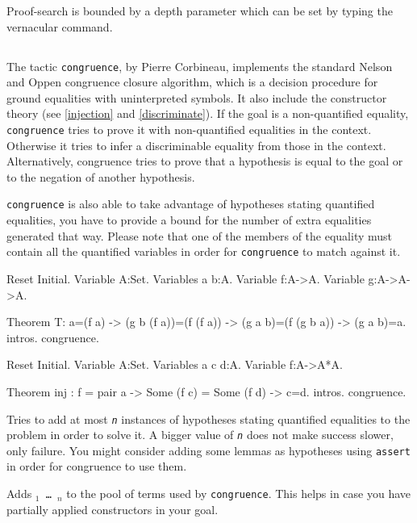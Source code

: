 Proof-search is bounded by a depth parameter which can be set by typing the
{} 
vernacular command.


\subsection{}
\label{congruence}

The tactic {\tt congruence}, by Pierre Corbineau, implements the standard Nelson and Oppen
congruence closure algorithm, which is a decision procedure for ground
equalities with uninterpreted symbols. It also include the constructor theory
(see \ref{injection} and \ref{discriminate}).
If the goal is a non-quantified equality, {\tt congruence} tries to
prove it with non-quantified equalities in the context. Otherwise it
tries to infer a discriminable equality from those in the context. Alternatively, congruence tries to prove that a hypothesis is equal to the goal or to the negation of another hypothesis.

{\tt congruence} is also able to take advantage of hypotheses stating quantified equalities, you have to provide a bound for the number of extra equalities generated that way. Please note that one of the members of the equality must contain all the quantified variables in order for {\tt congruence} to match against it.

\begin{coq_eval}
Reset Initial.
Variable A:Set.
Variables a b:A.
Variable f:A->A.
Variable g:A->A->A.
\end{coq_eval}

\begin{coq_example}
Theorem T:
  a=(f a) -> (g b (f a))=(f (f a)) -> (g a b)=(f (g b a)) -> (g a b)=a.
intros.
congruence.
\end{coq_example}

\begin{coq_eval}
Reset Initial.
Variable A:Set.
Variables a c d:A.
Variable f:A->A*A.
\end{coq_eval}

\begin{coq_example}
Theorem inj : f = pair a -> Some (f c) = Some (f d) -> c=d.
intros.
congruence.
\end{coq_example}

\begin{Variants}
 \item {}

  Tries to add at most {\tt \sl n} instances of hypotheses stating quantified equalities to the problem in order to solve it. A bigger value of {\tt \sl n} does not make success slower, only failure. You might consider adding some lemmas as hypotheses using {\tt assert} in order for congruence to use them.

\item {}

  Adds {\tt \term$_1$ \dots\ \term$_n$} to the pool of terms used by
  {\tt congruence}. This helps in case you have partially applied
  constructors in your goal.
\end{Variants}

